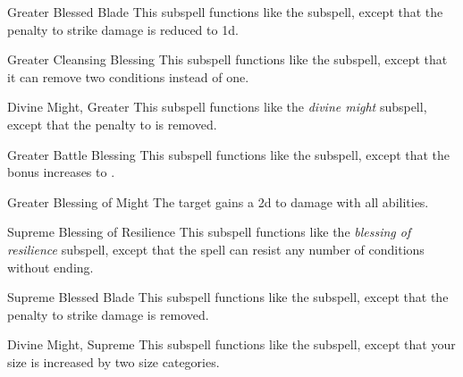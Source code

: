 \begin{ability}[\nth{4}]{Greater Blessed Blade}
This subspell functions like the  subspell, except that the penalty to strike damage is reduced to \minus1d.
\end{ability}
\vspace{0.25em}


\begin{ability}[\nth{4}]{Greater Cleansing Blessing}
This subspell functions like the  subspell, except that it can remove two conditions instead of one.
\end{ability}
\vspace{0.25em}


\begin{ability}[\nth{5}]{Divine Might, Greater}
This subspell functions like the \textit{divine might} subspell, except that the penalty to  is removed.
\end{ability}
\vspace{0.25em}


\begin{ability}[\nth{5}]{Greater Battle Blessing}
This subspell functions like the  subspell, except that the bonus increases to .
\end{ability}
\vspace{0.25em}


\begin{ability}[\nth{5}]{Greater Blessing of Might}
The target gains a \plus2d  to damage with all abilities.
\end{ability}
\vspace{0.25em}


\begin{ability}[\nth{5}]{Supreme Blessing of Resilience}
This subspell functions like the \textit{blessing of resilience} subspell, except that the spell can resist any number of conditions without ending.
\end{ability}
\vspace{0.25em}


\begin{ability}[\nth{6}]{Supreme Blessed Blade}
This subspell functions like the  subspell, except that the penalty to strike damage is removed.
\end{ability}
\vspace{0.25em}


\begin{ability}[\nth{7}]{Divine Might, Supreme}
This subspell functions like the  subspell, except that your size is increased by two size categories.
\end{ability}
\vspace{0.25em}

